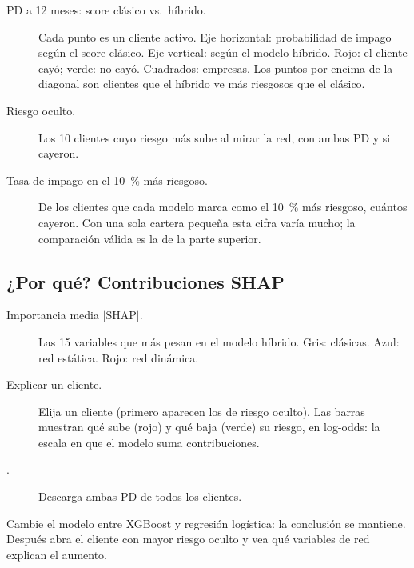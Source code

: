 \begin{description}
\item[PD a 12 meses: score clásico vs.\ híbrido.] Cada punto es un cliente activo. Eje
horizontal: probabilidad de impago según el score clásico. Eje vertical: según el modelo
híbrido. \textcolor{rojo}{Rojo}: el cliente cayó; \textcolor{verde}{verde}: no cayó.
Cuadrados: empresas. Los puntos por encima de la diagonal son clientes que el híbrido ve
más riesgosos que el clásico.
\item[Riesgo oculto.] Los 10 clientes cuyo riesgo más sube al mirar la red, con ambas PD y
si cayeron.
\item[Tasa de impago en el 10~\% más riesgoso.] De los clientes que cada modelo marca
como el 10~\% más riesgoso, cuántos cayeron. Con una sola cartera pequeña esta cifra
varía mucho; la comparación válida es la de la parte superior.
\end{description}


\subsection*{¿Por qué? Contribuciones SHAP}
\begin{description}
\item[Importancia media $|$SHAP$|$.] Las 15 variables que más pesan en el modelo híbrido.
Gris: clásicas. Azul: red estática. Rojo: red dinámica.
\item[Explicar un cliente.] Elija un cliente (primero aparecen los de riesgo oculto). Las
barras muestran qué sube (rojo) y qué baja (verde) su riesgo, en log-odds: la escala en
que el modelo suma contribuciones.
\item[.] Descarga ambas PD de todos los clientes.
\end{description}

\begin{pruebe}
Cambie el modelo entre XGBoost y regresión logística: la conclusión se mantiene. Después
abra el cliente con mayor riesgo oculto y vea qué variables de red explican el aumento.
\end{pruebe}
